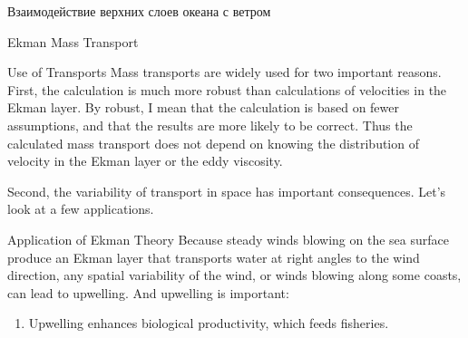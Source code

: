 \begin{chapter}{Взаимодействие верхних слоев океана с ветром}
\begin{section}{Ekman Mass Transport}
\begin{paragraph}{Use of Transports}
Mass transports are
widely used for two important reasons. First, the calculation is much
more robust than calculations of velocities in the Ekman layer. By
robust, I mean that the calculation is based on fewer assumptions, and
that the results are more likely to be correct. Thus the calculated
mass transport does not depend on knowing the distribution of velocity
in the Ekman layer or the eddy viscosity.
%

Second, the variability of transport in space has important
consequences.  Let's look at a few applications.
%
\end{paragraph}
\end{section}

\begin{section}{Application of Ekman Theory}
Because steady winds blowing on the sea surface produce an Ekman layer
that transports water at right
angles to the wind direction, any spatial variability of the wind, or
winds blowing along some coasts, can lead to
upwelling. And
upwelling is important:
%
%
\begin{enumerate}
\item 
Upwelling enhances biological productivity, which feeds fisheries.
%


\end{enumerate}
\end{section}
\end{chapter}
